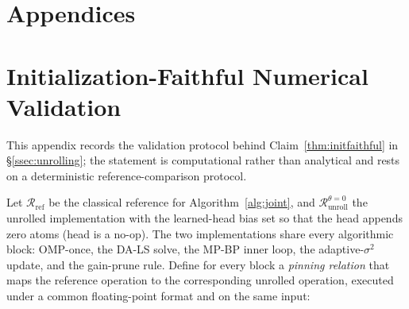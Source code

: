 \section*{Appendices}

\renewcommand{\thesection}{\Alph{section}}
\setcounter{section}{0}

\section{Initialization-Faithful Numerical Validation}
\label{app:initfaithful}

This appendix records the validation protocol behind Claim~\ref{thm:initfaithful}
in \S\ref{ssec:unrolling}; the statement is computational rather than
analytical and rests on a deterministic reference-comparison protocol.

Let $\mathcal{R}_\text{ref}$ be the classical reference for
Algorithm~\ref{alg:joint}, and $\mathcal{R}_\text{unroll}^{\theta=0}$ the
unrolled implementation with the learned-head bias set so that
the head appends zero atoms (head is a no-op). The two implementations
share every algorithmic block: OMP-once, the DA-LS solve, the MP-BP
inner loop, the adaptive-$\sigma^2$ update, and the gain-prune rule.
Define for every block a \emph{pinning relation} that maps the
reference operation to the corresponding unrolled operation, executed
under a common floating-point format and on the same input:

